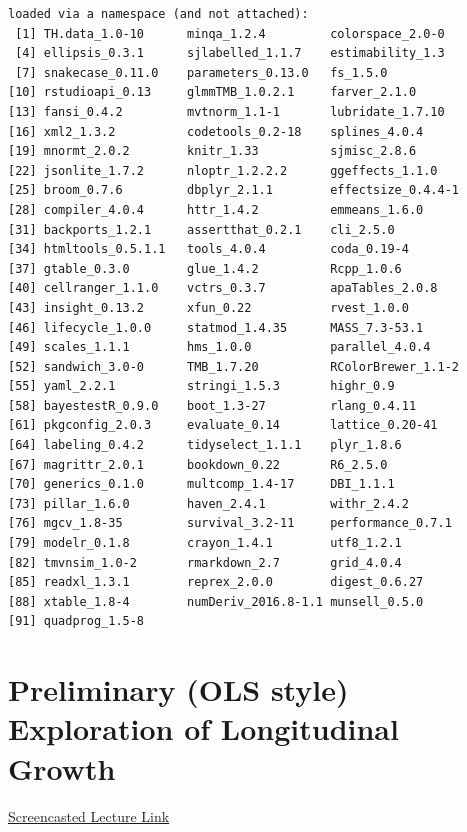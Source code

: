 \documentclass[
  english,
]{book}
\begin{document}
\begin{verbatim}
loaded via a namespace (and not attached):
 [1] TH.data_1.0-10      minqa_1.2.4         colorspace_2.0-0   
 [4] ellipsis_0.3.1      sjlabelled_1.1.7    estimability_1.3   
 [7] snakecase_0.11.0    parameters_0.13.0   fs_1.5.0           
[10] rstudioapi_0.13     glmmTMB_1.0.2.1     farver_2.1.0       
[13] fansi_0.4.2         mvtnorm_1.1-1       lubridate_1.7.10   
[16] xml2_1.3.2          codetools_0.2-18    splines_4.0.4      
[19] mnormt_2.0.2        knitr_1.33          sjmisc_2.8.6       
[22] jsonlite_1.7.2      nloptr_1.2.2.2      ggeffects_1.1.0    
[25] broom_0.7.6         dbplyr_2.1.1        effectsize_0.4.4-1 
[28] compiler_4.0.4      httr_1.4.2          emmeans_1.6.0      
[31] backports_1.2.1     assertthat_0.2.1    cli_2.5.0          
[34] htmltools_0.5.1.1   tools_4.0.4         coda_0.19-4        
[37] gtable_0.3.0        glue_1.4.2          Rcpp_1.0.6         
[40] cellranger_1.1.0    vctrs_0.3.7         apaTables_2.0.8    
[43] insight_0.13.2      xfun_0.22           rvest_1.0.0        
[46] lifecycle_1.0.0     statmod_1.4.35      MASS_7.3-53.1      
[49] scales_1.1.1        hms_1.0.0           parallel_4.0.4     
[52] sandwich_3.0-0      TMB_1.7.20          RColorBrewer_1.1-2 
[55] yaml_2.2.1          stringi_1.5.3       highr_0.9          
[58] bayestestR_0.9.0    boot_1.3-27         rlang_0.4.11       
[61] pkgconfig_2.0.3     evaluate_0.14       lattice_0.20-41    
[64] labeling_0.4.2      tidyselect_1.1.1    plyr_1.8.6         
[67] magrittr_2.0.1      bookdown_0.22       R6_2.5.0           
[70] generics_0.1.0      multcomp_1.4-17     DBI_1.1.1          
[73] pillar_1.6.0        haven_2.4.1         withr_2.4.2        
[76] mgcv_1.8-35         survival_3.2-11     performance_0.7.1  
[79] modelr_0.1.8        crayon_1.4.1        utf8_1.2.1         
[82] tmvnsim_1.0-2       rmarkdown_2.7       grid_4.0.4         
[85] readxl_1.3.1        reprex_2.0.0        digest_0.6.27      
[88] xtable_1.8-4        numDeriv_2016.8-1.1 munsell_0.5.0      
[91] quadprog_1.5-8     
\end{verbatim}

\hypertarget{MLMexplore}{%
\chapter{Preliminary (OLS style) Exploration of Longitudinal Growth}\label{MLMexplore}}

\href{https://spu.hosted.panopto.com/Panopto/Pages/Viewer.aspx?pid=36075f1d-b805-40b9-92da-ad2b0053f46cs}{Screencasted Lecture Link}
\end{document}
